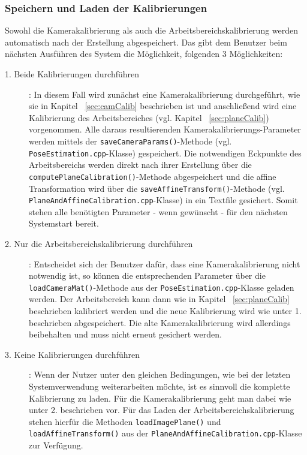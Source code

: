 \subsubsection{Speichern und Laden der Kalibrierungen}\label{sec:saveCalib}
Sowohl die Kamerakalibrierung als auch die Arbeitsbereichskalibrierung werden automatisch nach der Erstellung abgespeichert. Das gibt dem Benutzer beim nächsten Ausführen des System die Möglichkeit, folgenden 3 Möglichkeiten: 
\begin{description}
	\item[1. Beide Kalibrierungen durchführen]: In diesem Fall wird zunächst eine Kamerakalibrierung durchgeführt, wie sie in Kapitel ~\ref{sec:camCalib} beschrieben ist und anschließend wird eine Kalibrierung des Arbeitsbereiches (vgl. Kapitel ~\ref{sec:planeCalib}) vorgenommen. Alle daraus resultierenden Kamerakalibrierungs-Parameter werden mittels der \texttt{saveCameraParams()}-Methode (vgl. \texttt{PoseEstimation.cpp}-Klasse) gespeichert. Die notwendigen Eckpunkte des Arbeitsbereichs werden direkt nach ihrer Erstellung über die \texttt{computePlaneCalibration()}-Methode abgespeichert und die affine Transformation wird über die \texttt{saveAffineTransform()}-Methode (vgl. \texttt{PlaneAndAffineCalibration.cpp}-Klasse) in ein Textfile gesichert. Somit stehen alle benötigten Parameter - wenn gewünscht - für den nächsten Systemstart bereit.
	
	\item[2. Nur die Arbeitsbereichskalibrierung durchführen]: Entscheidet sich der Benutzer dafür, dass eine Kamerakalibrierung nicht notwendig ist, so können die entsprechenden Parameter über die \texttt{loadCameraMat()}-Methode aus der \texttt{PoseEstimation.cpp}-Klasse geladen werden. Der Arbeitsbereich kann dann wie in Kapitel ~\ref{sec:planeCalib} beschrieben kalibriert werden und die neue Kalibrierung wird wie unter 1. beschrieben abgespeichert. Die alte Kamerakalibrierung wird allerdings beibehalten und muss nicht erneut gesichert werden. 
	
	\item[3. Keine Kalibrierungen durchführen]: Wenn der Nutzer unter den gleichen Bedingungen, wie bei der letzten Systemverwendung weiterarbeiten möchte, ist es sinnvoll die komplette Kalibrierung zu laden. Für die Kamerakalibrierung geht man dabei wie unter 2. beschrieben vor. Für das Laden der Arbeitsbereichskalibrierung stehen hierfür die Methoden \texttt{loadImagePlane()} und \texttt{loadAffineTransform()} aus der \texttt{PlaneAndAffineCalibration.cpp}-Klasse zur Verfügung.
\end{description}
